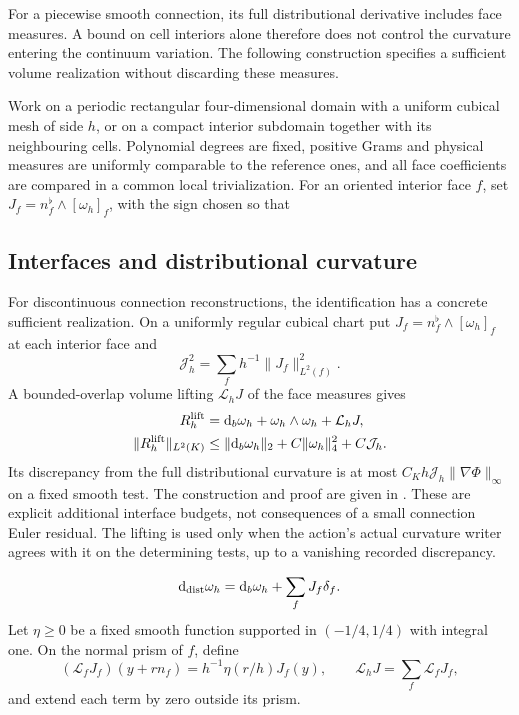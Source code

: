 \documentclass[11pt]{article}
\numberwithin{equation}{section}
\theoremstyle{definition}
\theoremstyle{remark}
\newcommand{\dd}{\mathrm d}
\begin{document}
For a piecewise smooth connection, its full distributional derivative includes
face measures.  A bound on cell interiors alone therefore does not control the
curvature entering the continuum variation.  The following construction
specifies a sufficient volume realization without discarding these measures.

Work on a periodic rectangular four-dimensional domain with a uniform cubical
mesh of side $h$, or on a compact interior subdomain together with its
neighbouring cells.  Polynomial degrees are fixed, positive Grams and physical
measures are uniformly comparable to the reference ones, and all face
coefficients are compared in a common local trivialization.  For an oriented
interior face $f$, set $J_f=n_f^\flat\wedge[\omega_h]_f$, with the sign
chosen so that
\subsection{Interfaces and distributional curvature}

For discontinuous connection reconstructions, the identification has a concrete
sufficient realization.  On a uniformly regular cubical chart put
$J_f=n_f^\flat\wedge[\omega_h]_f$ at each interior face and
\begin{equation}
 \mathcal J_h^2=\sum_fh^{-1}\|J_f\|_{L^2(f)}^2.
 \label{eq:main-interface-budget}
\end{equation}
A bounded-overlap volume lifting $\mathcal L_hJ$ of the face measures gives
\begin{equation}
 \begin{aligned}
 R_h^{\rm lift}
   &=\dd_b\omega_h+\omega_h\wedge\omega_h+\mathcal L_hJ,\\
 \|R_h^{\rm lift}\|_{L^2(K)}
   &\le\|\dd_b\omega_h\|_2+C\|\omega_h\|_4^2+C\mathcal J_h.
 \end{aligned}
 \label{eq:main-lifted-curvature}
\end{equation}
Its discrepancy from the full distributional curvature is at most
$C_Kh\mathcal J_h\|\nabla\Phi\|_\infty$ on a fixed smooth test.  The
construction and proof are given in .
These are explicit additional interface budgets, not consequences of a small
connection Euler residual.  The lifting is used only when the action's actual
curvature writer agrees with it on the determining tests, up to a vanishing
recorded discrepancy.

\begin{equation}
 \dd_{\rm dist}\omega_h=\dd_b\omega_h+\sum_fJ_f\delta_f.
 \label{eq:supp-connection-jumps}
\end{equation}
Let $\eta\ge0$ be a fixed smooth function supported in $(-1/4,1/4)$ with
integral one.  On the normal prism of $f$, define
\begin{equation}
 (\mathcal L_fJ_f)(y+rn_f)=h^{-1}\eta(r/h)J_f(y),\qquad
 \mathcal L_hJ=\sum_f\mathcal L_fJ_f,
 \label{eq:supp-interface-lifting}
\end{equation}
and extend each term by zero outside its prism.
\end{document}
